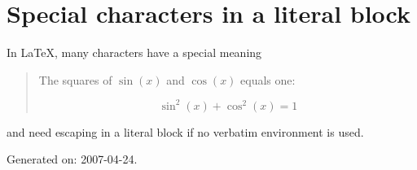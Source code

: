 \documentclass[10pt,a4paper,english]{article}
\begin{document}

\hypertarget{special-characters-in-a-literal-block}{}
\section*{Special characters in a literal block}

In LaTeX, many characters have a special meaning
\begin{quote}
\begin{literalblock}
The squares of $\sin(x)$ and $\cos(x)$ equals one:

$$
   \sin^2(x) + \cos^2(x) = 1
$$
\end{literalblock}
\end{quote}

and need escaping in a literal block if no verbatim environment is
used.

\begin{center}\small

Generated on: 2007-04-24.


\end{center}
\end{document}

